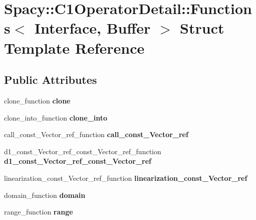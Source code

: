 \hypertarget{structSpacy_1_1C1OperatorDetail_1_1Functions}{\section{\-Spacy\-:\-:\-C1\-Operator\-Detail\-:\-:\-Functions$<$ \-Interface, \-Buffer $>$ \-Struct \-Template \-Reference}
\label{structSpacy_1_1C1OperatorDetail_1_1Functions}
}
\subsection*{\-Public \-Attributes}
\begin{DoxyCompactItemize}
\item 
\hypertarget{structSpacy_1_1C1OperatorDetail_1_1Functions_ad92c59d39afd9cc34e9a4f4d88f5b04c}{clone\-\_\-function {\bfseries clone}}\label{structSpacy_1_1C1OperatorDetail_1_1Functions_ad92c59d39afd9cc34e9a4f4d88f5b04c}

\item 
\hypertarget{structSpacy_1_1C1OperatorDetail_1_1Functions_a5c99ef24d30b72eebae2a5912a747795}{clone\-\_\-into\-\_\-function {\bfseries clone\-\_\-into}}\label{structSpacy_1_1C1OperatorDetail_1_1Functions_a5c99ef24d30b72eebae2a5912a747795}

\item 
\hypertarget{structSpacy_1_1C1OperatorDetail_1_1Functions_a54d92f417a81a90c10721ab745a1167a}{call\-\_\-const\-\_\-\-Vector\-\_\-ref\-\_\-function {\bfseries call\-\_\-const\-\_\-\-Vector\-\_\-ref}}\label{structSpacy_1_1C1OperatorDetail_1_1Functions_a54d92f417a81a90c10721ab745a1167a}

\item 
\hypertarget{structSpacy_1_1C1OperatorDetail_1_1Functions_a8e5a049693309c927f0c2d4e6d012914}{d1\-\_\-const\-\_\-\-Vector\-\_\-ref\-\_\-const\-\_\-\-Vector\-\_\-ref\-\_\-function {\bfseries d1\-\_\-const\-\_\-\-Vector\-\_\-ref\-\_\-const\-\_\-\-Vector\-\_\-ref}}\label{structSpacy_1_1C1OperatorDetail_1_1Functions_a8e5a049693309c927f0c2d4e6d012914}

\item 
\hypertarget{structSpacy_1_1C1OperatorDetail_1_1Functions_a87c28f8492892f70a16b3661cc41f882}{linearization\-\_\-const\-\_\-\-Vector\-\_\-ref\-\_\-function {\bfseries linearization\-\_\-const\-\_\-\-Vector\-\_\-ref}}\label{structSpacy_1_1C1OperatorDetail_1_1Functions_a87c28f8492892f70a16b3661cc41f882}

\item 
\hypertarget{structSpacy_1_1C1OperatorDetail_1_1Functions_a1ca313a2da4472a10043c73b9806bb0f}{domain\-\_\-function {\bfseries domain}}\label{structSpacy_1_1C1OperatorDetail_1_1Functions_a1ca313a2da4472a10043c73b9806bb0f}

\item 
\hypertarget{structSpacy_1_1C1OperatorDetail_1_1Functions_aeb6f924077e9192b84baa46ac0f9d3af}{range\-\_\-function {\bfseries range}}\label{structSpacy_1_1C1OperatorDetail_1_1Functions_aeb6f924077e9192b84baa46ac0f9d3af}

\end{DoxyCompactItemize}
